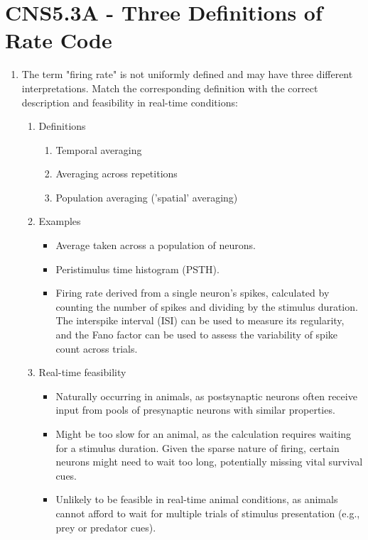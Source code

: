 \documentclass[11pt,letterpaper]{article}
\begin{document}
\section{CNS5.3A - Three Definitions of Rate Code}
\begin{enumerate}
    \item The term "firing rate" is not uniformly defined and may have three different interpretations. Match the corresponding definition with the correct description and feasibility in real-time conditions:
    \begin{enumerate}
        \item Definitions
        \begin{enumerate}
            \item Temporal averaging
            \item Averaging across repetitions
            \item Population averaging ('spatial' averaging)
        \end{enumerate}

        \item Examples
        \begin{itemize}
            \item \underline{\hspace{1.5 cm}} Average taken across a population of neurons.
            \item \underline{\hspace{1.5 cm}} Peristimulus time histogram (PSTH).
            \item \underline{\hspace{1.5 cm}} Firing rate derived from a single neuron's spikes, calculated by counting the number of spikes and dividing by the stimulus duration. The interspike interval (ISI) can be used to measure its regularity, and the Fano factor can be used to assess the variability of spike count across trials.
        \end{itemize}

        \item Real-time feasibility
        \begin{itemize}
            \item \underline{\hspace{1.5 cm}} Naturally occurring in animals, as postsynaptic neurons often receive input from pools of presynaptic neurons with similar properties.
            \item \underline{\hspace{1.5 cm}} Might be too slow for an animal, as the calculation requires waiting for a stimulus duration. Given the sparse nature of firing, certain neurons might need to wait too long, potentially missing vital survival cues.
            \item \underline{\hspace{1.5 cm}} Unlikely to be feasible in real-time animal conditions, as animals cannot afford to wait for multiple trials of stimulus presentation (e.g., prey or predator cues).
        \end{itemize}   
    \end{enumerate}
\end{enumerate}
\pagebreak
\end{document}
